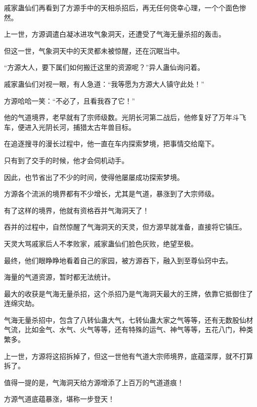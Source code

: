 \begin{this_body}
戚家蛊仙们再看到了方源手中的天相杀招后，再无任何侥幸心理，一个个面色惨然。

上一世，方源调遣白凝冰进攻气象洞天，还遭受了气海无量杀招的轰击。

但这一世，气象洞天中的天灵都未被惊醒，还在沉眠当中。

“方源大人，要下属们如何搬迁这里的资源呢？”异人蛊仙询问着。

戚家蛊仙们对视一眼，有人急道：“我等愿为方源大人镇守此处！”

方源哈哈一笑：“不必了，且看我吞了它！”

他的气道境界，老早就有了宗师级数。光阴长河第二战后，他修复好了万年斗飞车，便进入光阴长河，捕猎太古年兽目标。

在追逐搜寻的漫长过程中，他一直在车内探索梦境，把事情交给麾下。

只有到了交手的时候，他才会伺机动手。

因此，也节省出了不少的时间，使得他屡屡成功探索梦境。

方源各个流派的境界都有不少增长，尤其是气道，暴涨到了大宗师级。

有了这样的境界，他就有资格吞并气海洞天了！

吞并的过程中，自然惊醒了气海洞天的天灵，但方源早就准备，直接将它镇压。

天灵大骂戚家后人不孝败家，戚家蛊仙们脸色灰败，绝望至极。

最终，他们眼睁睁地看着自己的家园，被方源吞下，融入到至尊仙窍中去。

海量的气道资源，暂时都无法统计。

最大的收获是气海无量杀招，这个杀招乃是气海洞天最大的王牌，依靠它抵御住了连绵灾劫。

气海无量杀招中，包含了八转仙蛊大气，七转仙蛊大家之气等等，还有无数股仙材气流，比如金气、水气、火气等等，还有特殊的运气、神气等等，五花八门，种类繁多。

上一世，方源将这招拆掉了，但这一世他有气道大宗师境界，底蕴深厚，就不打算拆了。

值得一提的是，气海洞天给方源增添了上百万的气道道痕！

方源气道底蕴暴涨，堪称一步登天！

\end{this_body}

